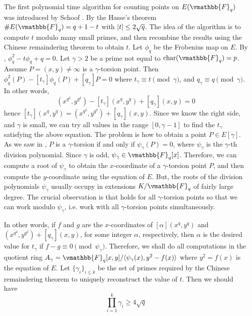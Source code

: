 The first polynomial time algorithm for counting points on $E(\vmathbb{F}_q)$ was introduced by 
Schoof \cite{Schoof1985}. By the Hasse's theorem $\#E(\vmathbb{F}_q) = q + 1 - t$ with $\left\vert t\right\vert \le 
2\sqrt{q}$. The idea of the algorithm is to compute $t$ modulo many small primes, and then recombine 
the results using the Chinese remaindering theorem to obtain $t$. Let $\phi_q$ be the Frobenius map 
on $E$. By , $\phi_q^2 - t\phi_q + q = 0$. Let $\gamma > 2$ be a prime not 
equal to  $\fieldchar(\vmathbb{F}_q) = p$. Assume $P = (x, y) \ne \infty$ is a $\gamma$-torsion 
point. Then $\phi_q^2(P) - [t_\gamma]\phi_q(P) + [q_\gamma]P = 0$ where $t_\gamma \equiv t \pmod 
\gamma$, and $q_\gamma \equiv q \pmod \gamma$. In other words,
\begin{equation}
\label{equation:Schoof-lt}
(x^{q^2}, y^{q^2}) -[t_\gamma](x^q, y^q) + [q_\gamma](x, y) = 0
\end{equation}
hence $[t_\gamma](x^q, y^q) = (x^{q^2}, y^{q^2}) + [q_\gamma](x, y)$. Since we know the right side, 
and $\gamma$ is small, we can try all values in the range $[0, \gamma - 1]$ to find the $t_\gamma$ 
satisfying the above equation. The problem is how to obtain a point $P \in E[\gamma]$. As we saw in 
, $P$ is a $\gamma$-torsion if and only if $\psi_\gamma(P) = 0$, where 
$\psi_\gamma$ is the $\gamma$-th division polynomial. Since $\gamma$ is odd, $\psi_\gamma \in 
\vmathbb{F}_q[x]$. Therefore, we can compute a root of $\psi_\gamma$ to obtain the $x$-coordinate of 
a $\gamma$-torsion point $P$, and then compute the $y$-coordinate using the equation of $E$. But, 
the roots of the division polynomials $\psi_\gamma$ usually occupy in extensions $K / \vmathbb{F}_q$ 
of fairly large degree. The crucial observation is that  holds for 
all $\gamma$-torsion points so that we can work modulo $\psi_\gamma$, i.e. work with all 
$\gamma$-torsion points simultaneously. 

In other words, if $f$ and $g$ are the $x$-coordinates of $[\alpha](x^q, y^q)$ and $(x^{q^2}, 
y^{q^2}) + [q_\gamma](x, y)$, for some integer $\alpha$, respectively, then $\alpha$ is the desired 
value for $t_\gamma$ if $f - g \equiv 0 \pmod {\psi_\gamma}$. Therefore, we shall do all 
computations in the quotient ring $A_\gamma = \vmathbb{F}_q[x, y] / \langle \psi_\gamma(x), y^2 - 
f(x) \rangle$ where $y^2 = f(x)$ is the equation of $E$. Let $\{ \gamma_i \}_{i \le k}$ be the set 
of primes required by the Chinese remaindering theorem to uniquely reconstruct the value of $t$. 
Then we should have
\begin{equation}
\label{equation:Schoof-ch-req}
\prod_{i = 1}^k \gamma_i \ge 4\sqrt{q}
\end{equation}

